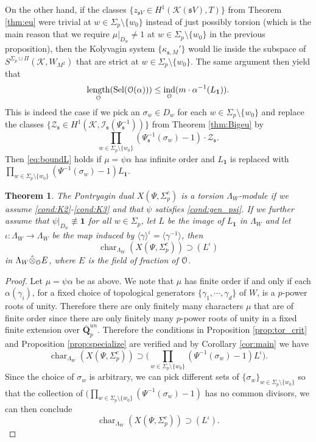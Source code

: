 \documentclass[leqno]{amsart}
\newtheorem{thm}{Theorem}[section]
\theoremstyle{definition}
\theoremstyle{remark}
\newcommand{\id}{\mathbf{1}}
\newcommand{\eo}{\EuScript{O}}
\newcommand{\Q}{{\mathbf{Q}}}
\DeclareMathOperator{\ind}{ind} %
\DeclareMathOperator{\length}{length}
\newcommand{\fs}{\mathfrak{s}}
\newcommand{\K}{{\mathcal{K}}} %
\newcommand{\I}{\mathcal{I}} %
\DeclareMathOperator{\Sel}{Sel}
\DeclareMathOperator{\car}{char}
\begin{document}
On the other hand, if the classes $\{z_{\fs V}\in H^1(\K(\fs V), T)\}$
from Theorem \ref{thm:eu}
were trivial at $w\in \Sigma_p\setminus\{w_0\}$
instead of just possibly torsion 
(which is the main reason that we require 
$\mu\vert_{D_w}\neq 1$ at $w\in \Sigma_p\setminus\{w_0\}$
in the previous proposition),
then the Kolyvagin system $\{\kappa_{\fs,M}'\}$
would lie inside the subspace of
$S^{\Sigma_p\cup\Pi}(\K, W_{M^2})$
that are strict at $w\in \Sigma_p\setminus\{w_0\}$.
The same argument then yield that 
\begin{equation}\label{eq:boundL}
    \length_\eo(\Sel(\eo(\alpha)))\leq \ind_{\eo}(m\cdot \alpha^{-1}(L_\id)).
\end{equation}
This is indeed the case if we pick an $\sigma_w\in D_w$
for each $w\in \Sigma_p\setminus\{w_0\}$
and replace the classes 
$\{\mathcal{Z}_\fs\in H^1(\K, \I_\fs(\Psi_\fs^{-1}))\}$ 
from Theorem \ref{thm:Bigeu} by
\[
    \prod_{w\in\Sigma_p\setminus\{w_0\}}
    (\Psi_\fs^{-1}(\sigma_w)-1)\cdot \mathcal{Z}_\fs.
\]
Then \eqref{eq:boundL} holds if $\mu=\psi\alpha$ has infinite order
and $L_\id$ is replaced with 
$\prod_{w\in\Sigma_p\setminus\{w_0\}}(\Psi^{-1}(\sigma_w)-1)L_\id$.




\begin{thm}

The Pontryagin dual
$X(\Psi,\Sigma_p^c)$ is a torsion $\Lambda_W$-module if 
we assume \ref{cond:K2}-\ref{cond:K3} and
that $\psi$ satisfies \eqref{cond:gen_psi}.
If we further assume that
$\psi\vert_{D_w}\not\equiv\id$  for all $w\in\Sigma_p$,
let $L$ be the image of $L_\id$ in $\Lambda_W$
and let $\iota\colon \Lambda_W\to\Lambda_W$
be the map induced by 
$\langle\gamma\rangle^\iota=\langle\gamma^{-1}\rangle$, then
\[
\car_{\Lambda_W}(X(\Psi,\Sigma_p^c))\supset(L^\iota)
\]
in $\Lambda_W\hat{\otimes}_\eo E$,
where $E$ is the field of fraction of $\eo$.
\end{thm}
\begin{proof}

Let $\mu=\psi\alpha$ be as above.
We note that $\mu$ has finite order if and only if 
each $\alpha(\gamma_i)$,
for a fixed choice of topological generators
$\{\gamma_1,\cdots,\gamma_d\}$ of $W$,
is a $p$-power roots of unity.
Therefore there are only finitely many characters $\mu$
that are of finite order 
since there are only finitely many 
$p$-power roots of unity in a fixed 
finite extension over $\bar{\Q}_p^{un}$.
Therefore the conditions in Proposition \ref{prop:tor_crit} and
Proposition \ref{prop:specialize}
are verified and by Corollary \ref{cor:main} we have
\[
\car_{\Lambda_W}(X(\Psi,\Sigma_p^c))\supset
\big(\prod_{w\in\Sigma_p\setminus\{w_0\}}
(\Psi^{-1}(\sigma_w)-1)L^\iota\big).
\]
Since the choice of $\sigma_w$ is arbitrary, 
we can pick different sets of 
$\{\sigma_w\}_{w\in \Sigma_p\setminus\{w_0\}}$
so that the collection of 
$\big(\prod_{w\in\Sigma_p\setminus\{w_0\}}
(\Psi^{-1}(\sigma_w)-1)$
has no common divisors, we can then conclude
\[
\car_{\Lambda_W}(X(\Psi,\Sigma_p^c))\supset(L^\iota).
\]


\end{proof}
\end{document}
